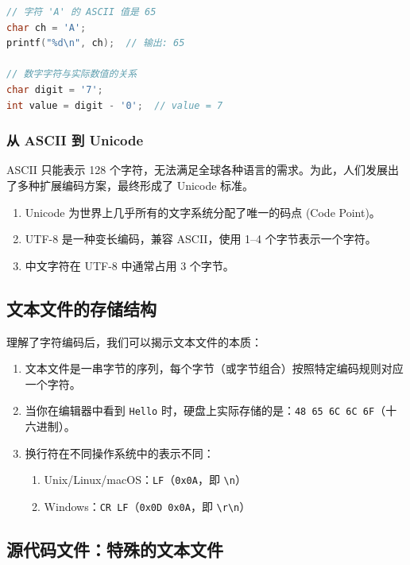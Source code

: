 \begin{lstlisting}[language=C, caption={ASCII 编码示例}, label={lst:ascii_example}]
// 字符 'A' 的 ASCII 值是 65
char ch = 'A';
printf("%d\n", ch);  // 输出: 65

// 数字字符与实际数值的关系
char digit = '7';
int value = digit - '0';  // value = 7
\end{lstlisting}

\subsubsection{从 ASCII 到 Unicode}

ASCII 只能表示 128 个字符，无法满足全球各种语言的需求。为此，人们发展出了多种扩展编码方案，最终形成了 Unicode 标准。

\begin{enumerate}[label={(\arabic*)}]
    \item Unicode 为世界上几乎所有的文字系统分配了唯一的码点 (Code Point)。
    \item UTF-8 是一种变长编码，兼容 ASCII，使用 1--4 个字节表示一个字符。
    \item 中文字符在 UTF-8 中通常占用 3 个字节。
\end{enumerate}

\subsection{文本文件的存储结构}
\label{subsec:text_file_storage}

理解了字符编码后，我们可以揭示文本文件的本质：

\begin{enumerate}[label={(\arabic*)}]
    \item 文本文件是一串字节的序列，每个字节（或字节组合）按照特定编码规则对应一个字符。
    \item 当你在编辑器中看到 \texttt{Hello} 时，硬盘上实际存储的是：\texttt{48 65 6C 6C 6F}（十六进制）。
    \item 换行符在不同操作系统中的表示不同：
        \begin{enumerate}[label={(\roman*)}]
            \item Unix/Linux/macOS：\texttt{LF}（\texttt{0x0A}，即 \verb|\n|）
            \item Windows：\texttt{CR LF}（\texttt{0x0D 0x0A}，即 \verb|\r\n|）
        \end{enumerate}
\end{enumerate}

\subsection{源代码文件：特殊的文本文件}
\label{subsec:source_code_file}

